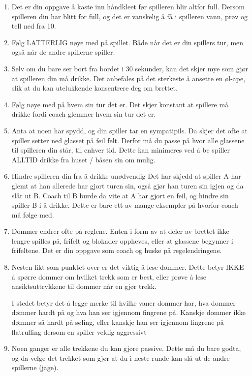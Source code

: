 \documentclass[10pt,a4paper,norsk,openany]{book}
\begin{document}
\begin{enumerate}
  \item Det er din oppgave å kaste inn håndkleet før spilleren blir altfor full.
    Dersom spilleren din har blitt for full, og det er vanskelig å få i
    spilleren vann, prøv og tell ned fra 10. 
    \item Følg LATTERLIG nøye med på spillet. Både når det er din spillers tur,
    men også når de andre spillerne spiller. 
  \item Selv om du bare ser bort fra bordet i 30 sekunder, kan det skjer
    mye som gjør at spilleren din må drikke. Det anbefales på det sterkeste å
    ansette en øl-ape, slik at du kan utelukkende konsentrere deg om brettet. 
  \item Følg nøye med på hvem sin tur det er. Det skjer konstant at spillere må
    drikke fordi coach glemmer hvem sin tur det er.
  \item Anta at noen har spydd, og din spiller tar en sympatipils. Da skjer det
    ofte at spiller setter ned glasset på feil felt. Derfor må du passe på hvor
    alle glassene til spilleren din står, til enhver tid. Dette kan minimeres
    ved å be spiller ALLTID drikke fra huset / båsen sin om mulig.
  \item Hindre spilleren din fra å drikke unødvendig Det har skjedd at spiller
    A har glemt at han allerede har gjort turen sin, også gjør han turen sin
    igjen og da slår ut B. Coach til B burde da vite at A har gjort en feil, og
    hindre sin spiller B i å drikke. Dette er bare ett av mange eksempler på
    hvorfor coach må følge med.
  \item Dommer endrer ofte på reglene. Enten i form av at deler av brettet ikke
    lengre spilles på, frifelt og blokader oppheves, eller at glassene begynner
    i frifeltene. Det er din oppgave som coach og huske på regelendringene.
  \item Nesten likt som punktet over er det viktig å lese dommer. Dette betyr
    IKKE å spørre dommer om hvilket trekk som er best, eller prøve å lese
    ansiktsuttrykkene til dommer når en gjør trekk.

    I stedet betyr det å legge merke til hvilke vaner dommer har, hva dommer
    dømmer hardt på og hva han ser igjennom fingrene på. Kanskje dommer ikke
    dømmer så hardt på søling, eller kanskje han ser igjennom fingrene på
    flatrulling dersom en spiller veldig aggressivt
  \item Noen ganger er alle trekkene du kan gjøre passive. Dette må du bare
    godta, og da velge det trekket som gjør at du i neste runde kan slå ut de
    andre spillerne (jage).
\end{enumerate}
\end{document}
